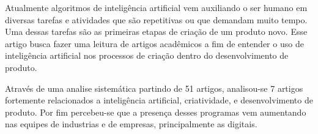 Atualmente algoritmos de inteligência artificial vem auxiliando o ser humano em diversas tarefas e atividades que são repetitivas ou que demandam muito tempo. Uma dessas tarefas são as primeiras etapas de criação de um produto novo. Esse artigo busca fazer uma leitura de artigos acadêmicos a fim de entender o uso de inteligência artificial nos processos de criação dentro do desenvolvimento de produto.

Através de uma analise sistemática partindo de 51 artigos, analisou-se 7 artigos fortemente relacionados a inteligência artificial, criatividade, e desenvolvimento de produto. Por fim percebeu-se que a presença desses programas vem aumentando nas equipes de industrias e de empresas, principalmente as digitais.